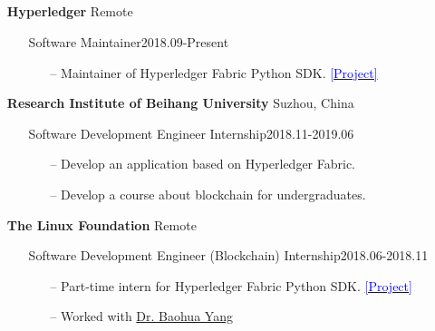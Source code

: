 \documentclass[11pt]{article}
\begin{document}
\subsection*{}
\begin{itemize}[leftmargin=0em, noitemsep, nolistsep]
    \setlength\itemsep{1em}
    \item[] \large\textbf{Hyperledger} \hfill Remote
        \begin{itemize}[noitemsep, nolistsep, leftmargin=0em]
            \item[] Software Maintainer\hfill 2018.09-Present
             \begin{itemize}
                \small
                \item[--] Maintainer of Hyperledger Fabric Python SDK. \href{https://github.com/hyperledger/fabric-sdk-py}{\textcolor{blue}{[Project]}}
             \end{itemize}
        \end{itemize} 
    \item[] \large\textbf{Research Institute of Beihang University} \hfill Suzhou, China
        \begin{itemize}[noitemsep, nolistsep, leftmargin=0em]
            \item[] Software Development Engineer Internship\hfill 2018.11-2019.06
             \begin{itemize}
                \small
                \item[--] Develop an application based on Hyperledger Fabric.
                \item[--] Develop a course about blockchain for undergraduates.
             \end{itemize}
        \end{itemize}
    \item[] \large\textbf{The Linux Foundation} \hfill Remote
        \begin{itemize}[noitemsep, nolistsep, leftmargin=0em]
            \item[] Software Development Engineer (Blockchain) Internship\hfill 2018.06-2018.11
             \begin{itemize}
                \small
                \item[--] Part-time intern for Hyperledger Fabric Python SDK. \href{https://github.com/hyperledger/fabric-sdk-py}{\textcolor{blue}{[Project]}}
                \item[--] Worked with \href{https://yeasy.github.io/}{Dr. Baohua Yang}
             \end{itemize}
        \end{itemize}
\end{itemize}
\end{document}
